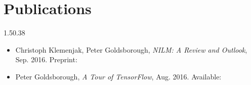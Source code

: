\section{Publications}{1.5}{0.38}
\vspace{-2mm}
\begin{itemize}
  \item Christoph Klemenjak, Peter Goldsborough, \emph{NILM: A Review and Outlook}, Sep. 2016. Preprint: 
  \item Peter Goldsborough, \emph{A Tour of TensorFlow}, Aug. 2016. Available: 
\end{itemize}


